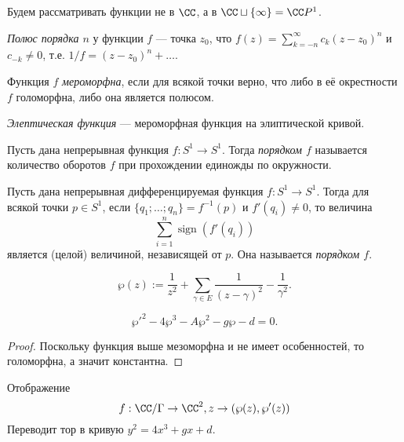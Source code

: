 \documentclass[12pt,a4paper]{article}
\DeclareMathOperator{\sign}{sign}
\begin{document}
    Будем рассматривать функции не в $\CC$, а в $\CC \sqcup \{\infty\} = \CC P^1$.

    \begin{definition}
        \emph{Полюс порядка $n$} у функции $f$ --- точка $z_0$, что $f(z) = \sum_{k=-n}^\infty c_k (z - z_0)^n$ и $c_{-k} \neq 0$, т.е. $1/f = (z - z_0)^n + \dots$. 
    \end{definition}

    \begin{definition}
        Функция $f$ \emph{мероморфна}, если для всякой точки верно, что либо в её окрестности $f$ голоморфна, либо она является полюсом.
    \end{definition}

    \begin{definition}
        \emph{Элептическая функция} --- мероморфная функция на элиптической кривой.
    \end{definition}

    \begin{definition}
        Пусть дана непрерывная функция $f: S^1 \to S^1$. Тогда \emph{порядком $f$} называется количество оборотов $f$ при прохождении единожды по окружности.
    \end{definition}

    \begin{definition}
        Пусть дана непрерывная дифференцируемая функция $f: S^1 \to S^1$. Тогда для всякой точки $p \in S^1$, 
        если $\{q_1; \dots; q_n\} = f^{-1}(p)$ и $f'(q_i) \neq 0$, то величина
        \[\sum_{i=1}^n \sign(f'(q_i))\]
        является (целой) величиной, независящей от $p$. Она называется \emph{порядком $f$}.
    \end{definition}

    \begin{definition}
        \[\wp(z) := \frac{1}{z^2} + \sum_{\gamma \in E} \frac{1}{(z-\gamma)^2} - \frac{1}{\gamma^2}.\]
    \end{definition}

    \begin{theorem}
        \[\wp'^2 - 4\wp^3 - A\wp^2 - g\wp - d = 0.\]
    \end{theorem}

    \begin{proof}
        Поскольку функция выше мезоморфна и не имеет особенностей, то голоморфна, а значит константна.
    \end{proof}

    \begin{corollary}
        Отображение
        \[f: \CC / \Gamma \to \CC^2, z \to (\wp(z), \wp'(z))\]
        Переводит тор в кривую $y^2 = 4x^3 + g x + d$.
    \end{corollary}
\end{document}
